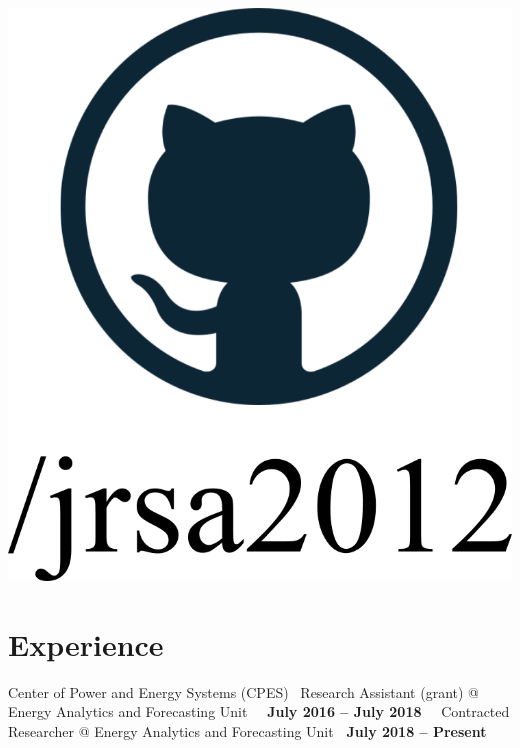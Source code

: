 \documentclass{mycv}
\begin{document}
\begin{center}
	\href{https://github.com/jrsa2012}{\includegraphics[scale=0.06]{figs/github_logo_label.png}}
	
\end{center}


\section{Experience}


{Center of Power and Energy Systems (CPES) }
{\textbullet~Research Assistant (grant) \hspace{0.38cm} @ \hspace{0.02cm} Energy Analytics and Forecasting Unit \hfill ~\textbf{\ July 2016 -- July 2018\ }}
{\textbullet~Contracted Researcher \hspace{1cm}  @ \hspace{0.02cm} Energy Analytics and Forecasting Unit \hfill \textbf{ \ July 2018 -- Present\ }}
\end{document}
